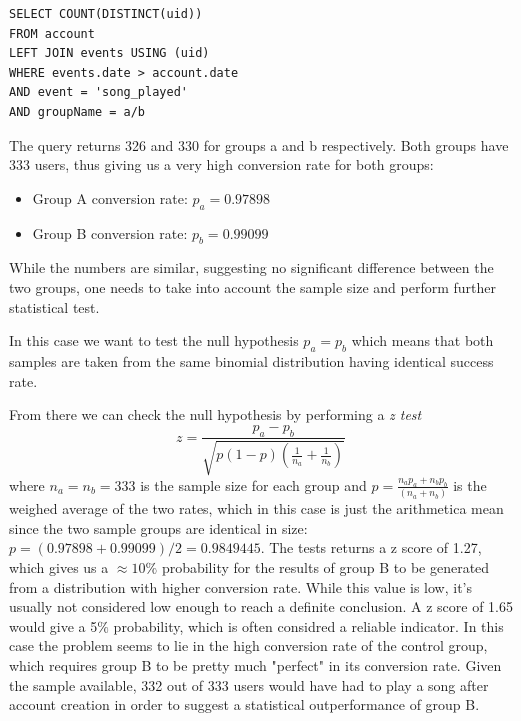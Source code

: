 \documentclass[paper=a4, fontsize=10pt]{report}
\begin{document}
\footnotesize
\begin{lstlisting}[frame=single,caption=Return conversion rates \label{code:sql_average_fixed_table}]
SELECT COUNT(DISTINCT(uid)) 
FROM account 
LEFT JOIN events USING (uid)
WHERE events.date > account.date
AND event = 'song_played'
AND groupName = a/b
\end{lstlisting}
\normalsize

The query returns 326 and 330 for groups a and b respectively. Both groups have 333 users, thus giving us a very high conversion rate for both groups:
\begin{itemize}
 \item Group A conversion rate: $p_{a} = 0.97898$
 \item Group B conversion rate: $p_{b} = 0.99099$
\end{itemize}


While the numbers are similar, suggesting no significant difference between the two groups, one needs to take into account the sample size and perform
further statistical test.


In this case we want to test the null hypothesis $p_{a} = p_{b}$ which means that both samples are taken from the same binomial distribution having identical
success rate.


From there we can check the null hypothesis by performing a \textit{z test}
\begin{equation}
 z = \frac{p_{a}-p_{b}}{\sqrt{p(1-p)(\frac{1}{n_{a}} + \frac{1}{n_{b}})}}
\end{equation}
where $n_{a} = n_{b} = 333 $ is the sample size for each group and $ p = \frac{n_{a}p_{a} + n_{b}p_{b}}{ (n_{a} + n_{b})}$ is the weighed average of the two rates,
which in this case is just the arithmetica mean since the two sample groups are identical in size: $p = (0.97898 + 0.99099)/2 = 0.9849445
$. The tests returns a z score of 1.27, which gives us a $\approx 10\%$ probability for the results of group B to be generated from a distribution with higher
conversion rate.
While this value is low, it's usually not considered low enough to reach a definite conclusion. A z score of 1.65 would give a 5$\%$ probability,
which is often considred a reliable indicator. In this case the problem seems to lie in the high conversion rate of the control group,
which requires group B to be pretty much "perfect" in its conversion rate. Given the sample available, 332 out of 333
users would have had to play a song after account creation in order to suggest a statistical outperformance of group B. 
\end{document}
